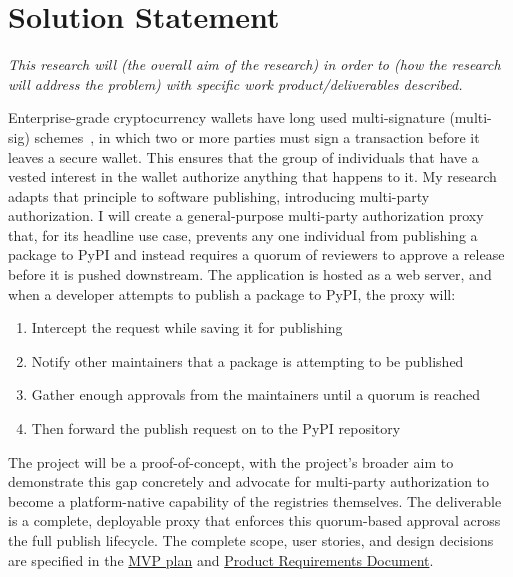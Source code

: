 \documentclass[12pt]{article}
\newcommand{\PRNumber}{3}
\newcommand{\RepoURL}{https://github.com/Ian-Costa18/Cybersecurity-Practicum/blob/progress-report-\PRNumber}
\newcommand{\instruction}[1]{{\small\itshape #1}}
\begin{document}
\section*{Solution Statement}

\instruction{This research will (the overall aim of the research) in order to (how the research will address the problem) with specific work product/deliverables described.}

Enterprise-grade cryptocurrency wallets have long used multi-signature (multi-sig) schemes~\cite{bip11-multisig}, in which two or more parties must sign a transaction before it leaves a secure wallet. This ensures that the group of individuals that have a vested interest in the wallet authorize anything that happens to it. My research adapts that principle to software publishing, introducing multi-party authorization. I will create a general-purpose multi-party authorization proxy that, for its headline use case, prevents any one individual from publishing a package to PyPI and instead requires a quorum of reviewers to approve a release before it is pushed downstream. The application is hosted as a web server, and when a developer attempts to publish a package to PyPI, the proxy will:

\begin{enumerate}
  \item Intercept the request while saving it for publishing
  \item Notify other maintainers that a package is attempting to be published
  \item Gather enough approvals from the maintainers until a quorum is reached
  \item Then forward the publish request on to the PyPI repository
\end{enumerate}

The project will be a proof-of-concept, with the project's broader aim to demonstrate this gap concretely and advocate for multi-party authorization to become a platform-native capability of the registries themselves. The deliverable is a complete, deployable proxy that enforces this quorum-based approval across the full publish lifecycle. The complete scope, user stories, and design decisions are specified in the \href{\RepoURL/docs/mvp.md}{MVP plan} and \href{\RepoURL/docs/mvp-prd.md}{Product Requirements Document}.

\end{document}
